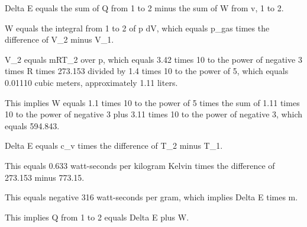 Delta E equals the sum of Q from 1 to 2 minus the sum of W from v, 1 to 2.

W equals the integral from 1 to 2 of p dV, which equals p_gas times the difference of V_2 minus V_1.

V_2 equals mRT_2 over p, which equals 3.42 times 10 to the power of negative 3 times R times 273.153 divided by 1.4 times 10 to the power of 5, which equals 0.01110 cubic meters, approximately 1.11 liters.

This implies W equals 1.1 times 10 to the power of 5 times the sum of 1.11 times 10 to the power of negative 3 plus 3.11 times 10 to the power of negative 3, which equals 594.843.

Delta E equals c_v times the difference of T_2 minus T_1.

This equals 0.633 watt-seconds per kilogram Kelvin times the difference of 273.153 minus 773.15.

This equals negative 316 watt-seconds per gram, which implies Delta E times m.

This implies Q from 1 to 2 equals Delta E plus W.